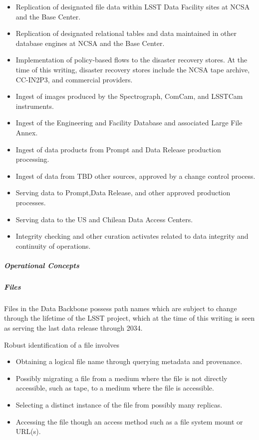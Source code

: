 \begin{itemize}

\item Replication of designated file data within LSST Data Facility sites
at NCSA and the Base Center.

\item Replication of designated relational tables and data maintained
in other database engines at NCSA and the Base Center.

\item Implementation of policy-based flows to the disaster recovery stores. At
the time of this writing, disaster recovery stores include the NCSA tape archive, CC-IN2P3,
and commercial providers.

\item Ingest of images produced by the Spectrograph, ComCam, and LSSTCam instruments.

\item Ingest of the Engineering and Facility Database and associated Large File Annex.

\item Ingest of data products from Prompt  and Data Release production processing.

\item Ingest of data from TBD other sources, approved by a change control process.

\item Serving data to Prompt,Data Release, and other approved production processes.

\item Serving data to the US and Chilean Data Access Centers.

\item Integrity checking and other curation activates related to data integrity and
continuity of operations.

\end{itemize}

\subparagraph{Operational Concepts}

\subparagraph{Files}

Files in the Data Backbone possess path names which are subject to change
through the lifetime of the LSST project, which at the time of this writing is
seen as serving the last data release through 2034.

Robust identification of a file involves
\begin{itemize}
\item Obtaining a logical file name through querying metadata and provenance.
\item Possibly migrating a file from a medium where the file is not directly accessible,
such as tape, to a medium where the file is accessible.
\item Selecting a distinct instance of the file from possibly many replicas.
\item Accessing the file though an access method such as a file system mount or URL(s).
\end{itemize}

